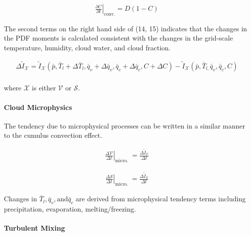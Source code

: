 \begin{eqnarray}
\left.\frac{\partial C}{\partial t}\right|_{\mathrm{conv} .}=D(1-C)
\end{eqnarray}

The second terms on the right hand side of (14, 15) indicates that the
changes in the PDF moments is calculated consistent with the changes in
the grid-scale temperature, humidity, cloud water, and cloud fraction.

\begin{eqnarray}
\Delta \tilde{I}_{\mathcal{X}}= \tilde{I}_{\mathcal{X}}\left(\bar{p}, \bar{T}_{l}+\Delta \bar{T}_{l}, \bar{q}_{v}+\Delta \bar{q}_{v}, \bar{q}_{c}+\Delta \bar{q}_{c}, C+\Delta C\right)
-\tilde{I}_{\mathcal{X}}\left(\bar{p}, \bar{T}_{l,} \bar{q}_{v}, \bar{q}_{c}, C\right)
\end{eqnarray}

\begin{eqnarray}
\label{W09-16}
\end{eqnarray} where \(\mathcal{X}\) is either \(\mathcal{V}\) or \(\mathcal{S}\).

\hypertarget{cloud-microphysics}{%
\paragraph{Cloud Microphysics}\label{cloud-microphysics}}

The tendency due to microphysical processes can be written in a similar
manner to the cumulus convection effect.

\begin{eqnarray}
\left.\frac{\Delta \mathcal{V}}{\Delta t}\right|_{\text {micro. }}=\frac{\Delta \tilde{I}_{\mathcal{V}}}{\Delta t}
\end{eqnarray}

\begin{eqnarray}
\left.\frac{\Delta \mathcal{S}}{\Delta t}\right|_{\text {micro. }}=\frac{\Delta \tilde{I}_{\mathcal{S}}}{\Delta t}
\end{eqnarray}

Changes in \(\bar{T}_{l}, \bar{q}_{v}, \text{and} \bar{q}_{c}\) are
derived from microphysical tendency terms including precipitation,
evaporation, melting/freezing.

\hypertarget{turbulent-mixing}{%
\paragraph{Turbulent Mixing}\label{turbulent-mixing}}

